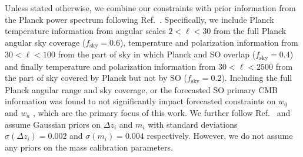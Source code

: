 \documentclass[%
 reprint,
nofootinbib,
 amsmath,amssymb,
 aps,
]{revtex4-1}
\begin{document}
Unless stated otherwise, we combine our constraints with prior information from the Planck power spectrum following Ref.~\cite{Madhavacheril:2017}. Specifically, we include Planck temperature information from angular scales $2< \ell <30$ from the full Planck angular sky coverage ($f_{\mathrm{sky}}=  0.6$), temperature and polarization information from $30< \ell <100$ from the part of sky in which Planck and SO overlap ($f_{\mathrm{sky}}=  0.4$) and finally temperature and polarization information from $30< \ell <2500$ from the part of sky covered by Planck but not by SO ($f_{\mathrm{sky}}= 0.2$). Including the full Planck angular range and sky coverage, or the forecasted SO primary CMB information was found to not significantly impact forecasted constraints on $w_{0}$ and $w_{a}$ \cite{Ade:2019}, which are the primary focus of this work. We further follow Ref.~\cite{Krause:2017} and assume Gaussian priors on $\Delta z_{i}$ and $m_{i}$ with standard deviations $\sigma(\Delta z_{i})=0.002$ and $\sigma(m_{i})=0.004$ respectively. However, we do not assume any priors on the mass calibration parameters.
\end{document}
